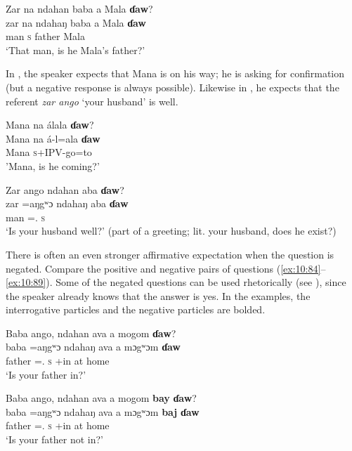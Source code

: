 \ea \label{ex:10:81}
Zar na  ndahan  baba  a  Mala  \textbf{ɗaw}?\\
\gll  zar   na   ndahaŋ   baba   a   Mala   \textbf{ɗaw}\\
      man    {\PSP}  \textsc{s}  father  {\GEN}  Mala  {\QUEST}\\
\glt  ‘That man, is he Mala’s father?’
\z

In , the speaker expects that Mana is on his way; he is asking for confirmation (but a negative response is always possible). Likewise in , he expects that the referent \textit{zar ango} ‘your husband’ is well.

\ea \label{ex:10:82}
Mana  na  álala  \textbf{ɗaw}?\\
\gll  Mana   na  á-l=ala    \textbf{ɗaw}\\
      Mana  {\PSP}  \textsc{s}+IPV-go=to  {\QUEST}\\
\glt  'Mana, is he coming?'
\z

\clearpage
\ea \label{ex:10:83}
Zar  ango  ndahan  aba  \textbf{ɗaw}?\\
\gll  zar     =aŋgʷɔ    ndahaŋ  aba   \textbf{ɗaw}\\
      man    ={\twoS}.{\POSS}  \textsc{s}  {\EXT}  {\QUEST}\\
\glt  ‘Is your husband well?’ (part of a greeting; lit. your husband, does he exist?) 
\z

There is often an even stronger affirmative expectation when the question is negated. Compare the positive and negative pairs of questions (\ref{ex:10:84}–\ref{ex:10:89}). Some of the negated questions can be used rhetorically (see ), since the speaker already knows that the answer is yes. In the examples, the interrogative particles and the negative particles are bolded.

\ea \label{ex:10:84}
Baba  ango,  ndahan  ava  a  mogom  \textbf{ɗaw}?\\
\gll  baba  =aŋgʷɔ    ndahaŋ   ava  a  mɔgʷɔm    \textbf{ɗaw}\\
      father  ={\twoS}.{\POSS}  \textsc{s}    {\EXT}+in  at  home    {\QUEST}\\
\glt  ‘Is your father in?’
\z

\ea \label{ex:10:85}
Baba  ango,  ndahan  ava  a  mogom  \textbf{bay}  \textbf{ɗaw}?\\
\gll  baba  =aŋgʷɔ    ndahaŋ ava  a  mɔgʷɔm   \textbf{baj}  \textbf{ɗaw}\\
      father  ={\twoS}.{\POSS}  \textsc{s}    {\EXT}+in  at  home    {\NEG}  {\QUEST}\\
\glt  ‘Is your father not in?’
\z

